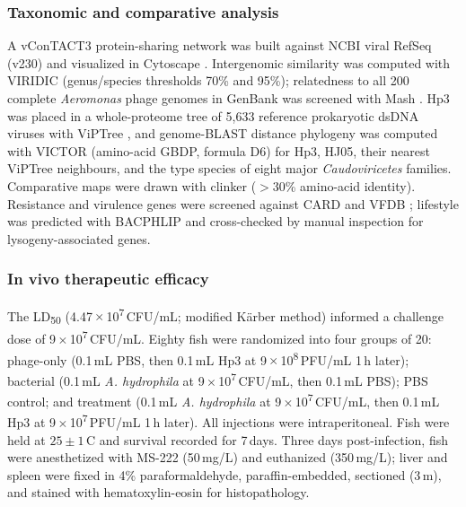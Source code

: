 \subsubsection*{Taxonomic and comparative analysis}
A vConTACT3 protein-sharing network was built against NCBI viral RefSeq (v230) and
visualized in Cytoscape \citep{2003-Cytoscape_Shannon}. Intergenomic similarity was
computed with VIRIDIC \citep{2020-VIRIDIC_Moraru} (genus/species thresholds 70\% and
95\%); relatedness to all 200 complete \emph{Aeromonas} phage genomes in GenBank was
screened with Mash \citep{2016-Mash_Ondov}. Hp3 was placed in a whole-proteome tree
of 5,633 reference prokaryotic dsDNA viruses with ViPTree
\citep{2017-ViPTree_Nishimura}, and genome-BLAST distance phylogeny was computed
with VICTOR \citep{2017-VICTOR_Meier-Kolthoff} (amino-acid GBDP, formula D6) for Hp3,
HJ05, their nearest ViPTree neighbours, and the type species of eight major
\emph{Caudoviricetes} families. Comparative maps were drawn with clinker
\citep{2021-Clinker_Gilchrist} ($>$30\% amino-acid identity). Resistance and
virulence genes were screened against CARD \citep{2020-CARD_Alcock} and VFDB
\citep{2019-VFDB_Liu}; lifestyle was predicted with BACPHLIP
\citep{2021-BACPHLIP_Hockenberry} and cross-checked by manual inspection for
lysogeny-associated genes.

\subsubsection*{In vivo therapeutic efficacy}
The LD\textsubscript{50} (4.47\,$\times$\,10\textsuperscript{7}\,CFU/mL; modified
K\"arber method) informed a challenge dose of 9\,$\times$\,10\textsuperscript{7}\,CFU/mL.
Eighty fish were randomized into four groups of 20: phage-only (0.1\,mL PBS, then
0.1\,mL Hp3 at 9\,$\times$\,10\textsuperscript{8}\,PFU/mL 1\,h later); bacterial
(0.1\,mL \emph{A. hydrophila} at 9\,$\times$\,10\textsuperscript{7}\,CFU/mL, then
0.1\,mL PBS); PBS control; and treatment (0.1\,mL \emph{A. hydrophila} at
9\,$\times$\,10\textsuperscript{7}\,CFU/mL, then 0.1\,mL Hp3 at
9\,$\times$\,10\textsuperscript{7}\,PFU/mL 1\,h later). All injections were
intraperitoneal. Fish were held at $25 \pm 1$\,\textdegree C and survival recorded
for 7\,days. Three days post-infection, fish were anesthetized with MS-222
(50\,mg/L) and euthanized (350\,mg/L); liver and spleen were fixed in 4\%
paraformaldehyde, paraffin-embedded, sectioned (3\,\textmu m), and stained with
hematoxylin-eosin for histopathology.

